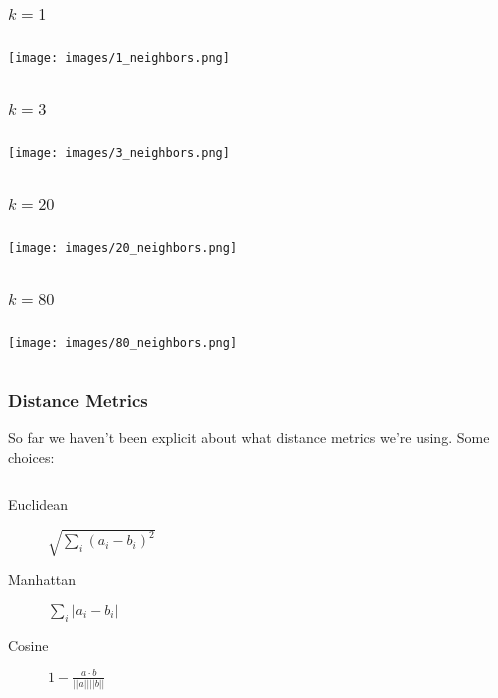 \documentclass{beamer}
\begin{document}
\begin{frame}
  \frametitle{$k=1$}
  \begin{columns}
    \texttt{[image: images/1\_neighbors.png]}
  \end{columns}
\end{frame}

\begin{frame}
  \frametitle{$k=3$}
  \begin{columns}
    \texttt{[image: images/3\_neighbors.png]}
  \end{columns}
\end{frame}

\begin{frame}
  \frametitle{$k=20$}
  \begin{columns}
    \texttt{[image: images/20\_neighbors.png]}
  \end{columns}
\end{frame}

\begin{frame}
  \frametitle{$k=80$}
  \begin{columns}
    \texttt{[image: images/80\_neighbors.png]}
  \end{columns}
\end{frame}

\begin{frame}
  \frametitle{Distance Metrics}
  So far we haven't been explicit about what distance metrics we're using. Some choices: \vspace{4mm}
  \begin{columns}
    \begin{description}
      \item[Euclidean] $ \sqrt{\sum_i (a_i - b_i)^2} $ \vspace{2mm}
      \item[Manhattan] $ \sum_i |a_i - b_i| $ \vspace{2mm}
      \item[Cosine] $ 1 - \frac{a \cdot b}{||a|| ||b||} $
    \end{description}
  \end{columns}
\end{frame}
\end{document}
